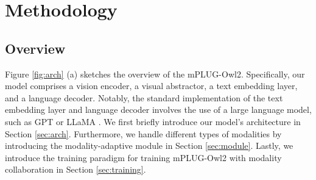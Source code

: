 \documentclass[10pt,twocolumn,letterpaper]{article}
\newcommand{\modelname}{mPLUG-Owl2\xspace}
\begin{document}
\vspace{-1ex}
\section{Methodology}
\subsection{Overview}
Figure \ref{fig:arch} (a) sketches the overview of the \modelname. Specifically, our model comprises a vision encoder, a visual abstractor, a text embedding layer, and a language decoder. Notably, the standard implementation of the text embedding layer and language decoder involves the use of a large language model, such as GPT \cite{Brown2020gpt3} or LLaMA \cite{Touvron2023LLaMA}. We first briefly introduce our model's architecture in Section \ref{sec:arch}. Furthermore, we handle different types of modalities by introducing the modality-adaptive module in Section \ref{sec:module}. Lastly, we introduce the training paradigm for training \modelname with modality collaboration in Section \ref{sec:training}.
\end{document}
